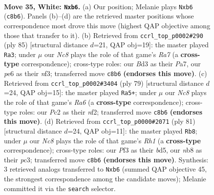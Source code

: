 \documentclass[11pt]{article}
\begin{document}
\clearpage

\begin{figure}[p]\centering
\begin{subfigure}{0.46\textwidth}\centering
\resizebox{\linewidth}{!}{%
\newchessgame
\chessboard[
  setfen={1nN5/6k1/1p2p3/6p1/5p2/3B1P2/2P3K1/3r4 w - - 0 35},
  showmover=false,
  pgfstyle=straightmove, color=movearrow, markmove={c8-b6}
]}
\caption{}
\end{subfigure}\hfill
\begin{subfigure}{0.46\textwidth}\centering
\resizebox{\linewidth}{!}{%
\newchessgame
\chessboard[
  setfen={R7/p4pk1/4p3/1P4P1/P7/5N1K/rb6/8 b - - 6 43},
  showmover=false,
  pgfstyle=straightmove, color=movearrow, markmove={a2-a3}
]}
\caption{}
\end{subfigure}
\\[4pt]
\begin{subfigure}{0.46\textwidth}\centering
\resizebox{\linewidth}{!}{%
\newchessgame
\chessboard[
  setfen={8/2R3bp/P4kp1/3K4/7P/r7/5N2/8 b - - 0 40},
  showmover=false,
  pgfstyle=straightmove, color=movearrow, markmove={a3-a5}
]}
\caption{}
\end{subfigure}\hfill
\begin{subfigure}{0.46\textwidth}\centering
\resizebox{\linewidth}{!}{%
\newchessgame
\chessboard[
  setfen={7r/8/3p4/KP1B1p1p/8/2P3kP/4Rb2/8 b - - 0 41},
  showmover=false,
  pgfstyle=straightmove, color=movearrow, markmove={h8-b8}
]}
\caption{}
\end{subfigure}
\caption{\textbf{Move 35, White: \texttt{Nxb6}.} (a) Our position; Melanie plays \texttt{Nxb6} (\texttt{c8b6}). Panels (b)--(d) are the retrieved master positions whose correspondence most drove this move (highest QAP objective among those that transfer to it). (b) Retrieved from \texttt{ccrl\_top\_p0002\#290} (ply 85) [structural distance $d$=21, QAP obj=19]: the master played \texttt{Ra3}; under $\mu$ our \emph{Nc8} plays the role of that game's \emph{Ra7} (a \textbf{cross-type} correspondence); cross-type roles: our \emph{B}d3 as their \emph{P}a7, our \emph{p}e6 as their \emph{n}f3; transferred move \texttt{c8b6} \textbf{(endorses this move)}. (c) Retrieved from \texttt{ccrl\_top\_p0002\#3404} (ply 79) [structural distance $d$=24, QAP obj=15]: the master played \texttt{Ra5+}; under $\mu$ our \emph{Nc8} plays the role of that game's \emph{Ra6} (a \textbf{cross-type} correspondence); cross-type roles: our \emph{P}c2 as their \emph{n}f2; transferred move \texttt{c8b6} \textbf{(endorses this move)}. (d) Retrieved from \texttt{ccrl\_top\_p0000\#2071} (ply 81) [structural distance $d$=24, QAP obj=11]: the master played \texttt{Rb8}; under $\mu$ our \emph{Nc8} plays the role of that game's \emph{Rh1} (a \textbf{cross-type} correspondence); cross-type roles: our \emph{P}f3 as their \emph{b}d5, our \emph{n}b8 as their \emph{p}c3; transferred move \texttt{c8b6} \textbf{(endorses this move)}. Synthesis: 3 retrieved analogs transferred to \texttt{Nxb6} (summed QAP objective 45, the strongest correspondence among the candidate moves); Melanie committed it via the \texttt{search} selector.}
\label{fig:thought-m68}
\end{figure}
\end{document}

